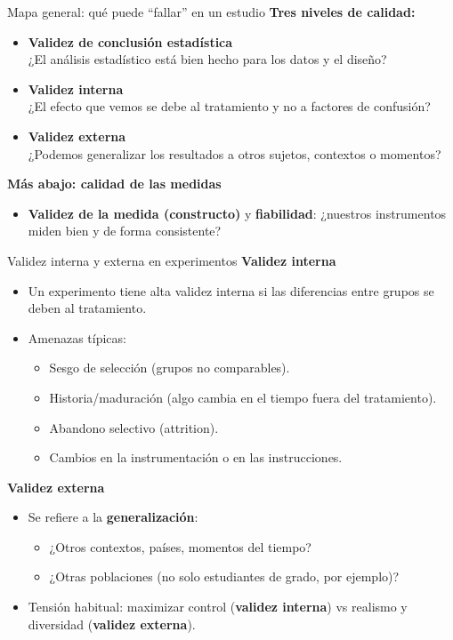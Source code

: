 ﻿\documentclass{beamer}
\begin{document}
\begin{frame}{Mapa general: qué puede “fallar” en un estudio}
    \textbf{Tres niveles de calidad:}
    \begin{itemize}
        \item \textbf{Validez de conclusión estadística} \\
        ¿El análisis estadístico está bien hecho para los datos y el diseño?
        \item \textbf{Validez interna} \\
        ¿El efecto que vemos se debe al tratamiento y no a factores de confusión?
        \item \textbf{Validez externa} \\
        ¿Podemos generalizar los resultados a otros sujetos, contextos o momentos?
    \end{itemize}
    \vspace{0.3cm}
    \textbf{Más abajo: calidad de las medidas}
    \begin{itemize}
        \item \textbf{Validez de la medida (constructo)} y \textbf{fiabilidad}: ¿nuestros instrumentos miden bien y de forma consistente?
    \end{itemize}
\end{frame}

\begin{frame}{Validez interna y externa en experimentos}
    \textbf{Validez interna}
    \begin{itemize}
        \item Un experimento tiene alta validez interna si las diferencias entre grupos se deben al tratamiento.
        \item Amenazas típicas:
        \begin{itemize}
            \item Sesgo de selección (grupos no comparables).
            \item Historia/maduración (algo cambia en el tiempo fuera del tratamiento).
            \item Abandono selectivo (attrition).
            \item Cambios en la instrumentación o en las instrucciones.
        \end{itemize}
    \end{itemize}

    \vspace{0.2cm}
    \textbf{Validez externa}
    \begin{itemize}
        \item Se refiere a la \textbf{generalización}:
        \begin{itemize}
            \item ¿Otros contextos, países, momentos del tiempo?
            \item ¿Otras poblaciones (no solo estudiantes de grado, por ejemplo)?
        \end{itemize}
        \item Tensión habitual: maximizar control (\textbf{validez interna}) vs realismo y diversidad (\textbf{validez externa}).
    \end{itemize}
\end{frame}
\end{document}
